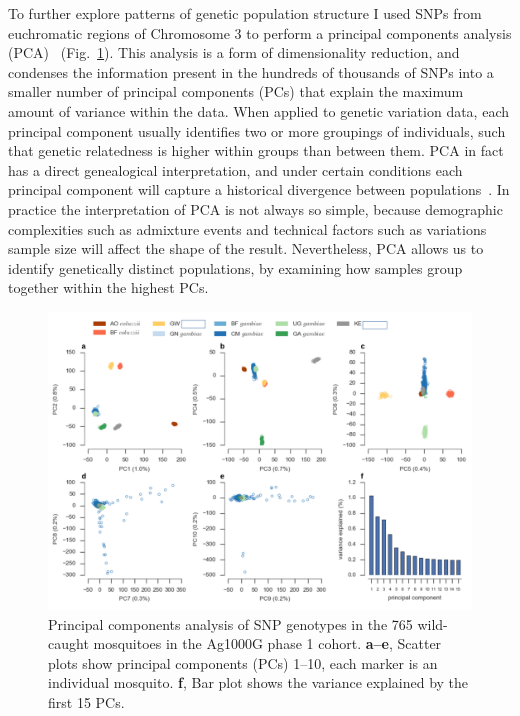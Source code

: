 \documentclass[a4paper,11pt,abstracton,hidelinks]{scrartcl}
\begin{document}
To further explore patterns of genetic population structure I used SNPs from euchromatic regions of Chromosome 3 to perform a principal components analysis (PCA)~\parencite{Patterson2006} (Fig.~\ref{fig:pca}).
%
This analysis is a form of dimensionality reduction, and condenses the information present in the hundreds of thousands of SNPs into a smaller number of principal components (PCs) that explain the maximum amount of variance within the data.
%
When applied to genetic variation data, each principal component usually identifies two or more groupings of individuals, such that genetic relatedness is higher within groups than between them.
%
PCA in fact has a direct genealogical interpretation, and under certain conditions each principal component will capture a historical divergence between populations~\parencite{McVean2009}.
%
In practice the interpretation of PCA is not always so simple, because demographic complexities such as admixture events and technical factors such as variations sample size will affect the shape of the result.
%
Nevertheless, PCA allows us to identify genetically distinct populations, by examining how samples group together within the highest PCs.


\begin{figure}[t!]
\centering
\includegraphics[width=1.1\textwidth,center]{artwork/chapter4/pca.pdf}
\caption{Principal components analysis of SNP genotypes in the 765 wild-caught mosquitoes in the Ag1000G phase 1 cohort.
%
\textbf{a--e}, Scatter plots show principal components (PCs) 1--10, each marker is an individual mosquito.
%
\textbf{f}, Bar plot shows the variance explained by the first 15 PCs.
%
}
\label{fig:pca}
\end{figure}
\end{document}
